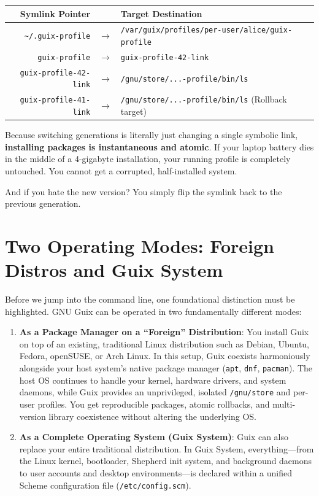\begin{center}
\small
\begin{tabular}{r c l}
\toprule
\textbf{Symlink Pointer} & & \textbf{Target Destination} \\
\midrule
\texttt{\textasciitilde/.guix-profile} & $\longrightarrow$ & \texttt{/var/guix/profiles/per-user/alice/guix-profile} \\
\texttt{guix-profile} & $\longrightarrow$ & \texttt{guix-profile-42-link} \\
\texttt{guix-profile-42-link} & $\longrightarrow$ & \texttt{/gnu/store/...-profile/bin/ls} \\
\texttt{guix-profile-41-link} & $\longrightarrow$ & \texttt{/gnu/store/...-profile/bin/ls} (Rollback target) \\
\bottomrule
\end{tabular}
\end{center}

Because switching generations is literally just changing a single symbolic link, \textbf{installing packages is instantaneous and atomic}. If your laptop battery dies in the middle of a 4-gigabyte installation, your running profile is completely untouched. You cannot get a corrupted, half-installed system.

And if you hate the new version? You simply flip the symlink back to the previous generation.

\section{Two Operating Modes: Foreign Distros and Guix System}

Before we jump into the command line, one foundational distinction must be highlighted. GNU Guix can be operated in two fundamentally different modes:

\begin{enumerate}
  \item \textbf{As a Package Manager on a ``Foreign'' Distribution}: You install Guix on top of an existing, traditional Linux distribution such as Debian, Ubuntu, Fedora, openSUSE, or Arch Linux. In this setup, Guix coexists harmoniously alongside your host system's native package manager (\texttt{apt}, \texttt{dnf}, \texttt{pacman}). The host OS continues to handle your kernel, hardware drivers, and system daemons, while Guix provides an unprivileged, isolated \texttt{/gnu/store} and per-user profiles. You get reproducible packages, atomic rollbacks, and multi-version library coexistence without altering the underlying OS.
  \item \textbf{As a Complete Operating System (Guix System)}: Guix can also replace your entire traditional distribution. In Guix System, everything---from the Linux kernel, bootloader, Shepherd init system, and background daemons to user accounts and desktop environments---is declared within a unified Scheme configuration file (\texttt{/etc/config.scm}).
\end{enumerate}

